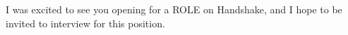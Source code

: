 \begin{cvletter}
	I was excited to see you opening for a ROLE on Handshake, and I hope
	to be invited to interview for this position.
\end{cvletter}
